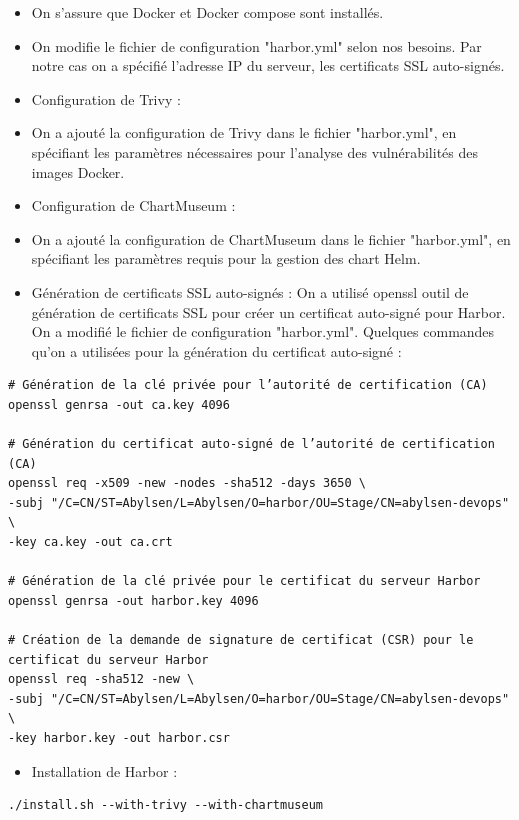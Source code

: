 \begin{itemize}
\item On s’assure que Docker et Docker compose sont installés.
\item On modifie le fichier de configuration "harbor.yml" selon nos besoins. Par notre cas on a spécifié l’adresse IP du serveur, les certificats SSL auto-signés.
\item Configuration de Trivy :
\item On a ajouté la configuration de Trivy dans le fichier "harbor.yml", en spécifiant les paramètres nécessaires pour l’analyse des vulnérabilités des images Docker.
\item Configuration de ChartMuseum :
\item On a ajouté la configuration de ChartMuseum dans le fichier "harbor.yml", en spécifiant les paramètres requis pour la gestion des chart Helm.
\item Génération de certificats SSL auto-signés : On a utilisé openssl outil de génération de certificats SSL pour créer un certificat auto-signé pour Harbor. On a modifié le fichier de configuration "harbor.yml". Quelques commandes qu’on a utilisées pour la génération du certificat auto-signé :
\end{itemize}

\begin{verbatim}
# Génération de la clé privée pour l’autorité de certification (CA)
openssl genrsa -out ca.key 4096

# Génération du certificat auto-signé de l’autorité de certification (CA)
openssl req -x509 -new -nodes -sha512 -days 3650 \
-subj "/C=CN/ST=Abylsen/L=Abylsen/O=harbor/OU=Stage/CN=abylsen-devops" \
-key ca.key -out ca.crt

# Génération de la clé privée pour le certificat du serveur Harbor
openssl genrsa -out harbor.key 4096

# Création de la demande de signature de certificat (CSR) pour le certificat du serveur Harbor
openssl req -sha512 -new \
-subj "/C=CN/ST=Abylsen/L=Abylsen/O=harbor/OU=Stage/CN=abylsen-devops" \
-key harbor.key -out harbor.csr
\end{verbatim}

\begin{itemize}
\item Installation de Harbor :
\end{itemize}

\begin{verbatim}
./install.sh --with-trivy --with-chartmuseum
\end{verbatim}

